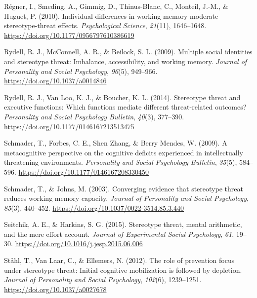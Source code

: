 \documentclass[
  doc, a4paper]{apa7}
\newlength{\cslhangindent}
\newenvironment{CSLReferences}[2] %
 {\begin{list}{}{%
  \setlength{\itemindent}{0pt}
  \setlength{\leftmargin}{0pt}
  \setlength{\parsep}{0pt}
  \ifodd #1
   \setlength{\leftmargin}{\cslhangindent}
   \setlength{\itemindent}{-1\cslhangindent}
  \fi
  \setlength{\itemsep}{#2\baselineskip}}}
 {\end{list}}
\begin{document}
\begin{CSLReferences}{1}{0}
Régner, I., Smeding, A., Gimmig, D., Thinus-Blanc, C., Monteil, J.-M., \& Huguet, P. (2010). Individual differences in working memory moderate stereotype-threat effects. \emph{Psychological Science}, \emph{21}(11), 1646--1648. \url{https://doi.org/10.1177/0956797610386619}

Rydell, R. J., McConnell, A. R., \& Beilock, S. L. (2009). Multiple social identities and stereotype threat: {Imbalance}, accessibility, and working memory. \emph{Journal of Personality and Social Psychology}, \emph{96}(5), 949--966. \url{https://doi.org/10.1037/a0014846}

Rydell, R. J., Van Loo, K. J., \& Boucher, K. L. (2014). Stereotype threat and executive functions: {Which} functions mediate different threat-related outcomes? \emph{Personality and Social Psychology Bulletin}, \emph{40}(3), 377--390. \url{https://doi.org/10.1177/0146167213513475}

Schmader, T., Forbes, C. E., Shen Zhang, \& Berry Mendes, W. (2009). A metacognitive perspective on the cognitive deficits experienced in intellectually threatening environments. \emph{Personality and Social Psychology Bulletin}, \emph{35}(5), 584--596. \url{https://doi.org/10.1177/0146167208330450}

Schmader, T., \& Johns, M. (2003). Converging evidence that stereotype threat reduces working memory capacity. \emph{Journal of Personality and Social Psychology}, \emph{85}(3), 440--452. \url{https://doi.org/10.1037/0022-3514.85.3.440}

Seitchik, A. E., \& Harkins, S. G. (2015). Stereotype threat, mental arithmetic, and the mere effort account. \emph{Journal of Experimental Social Psychology}, \emph{61}, 19--30. \url{https://doi.org/10.1016/j.jesp.2015.06.006}

Ståhl, T., Van Laar, C., \& Ellemers, N. (2012). The role of prevention focus under stereotype threat: {Initial} cognitive mobilization is followed by depletion. \emph{Journal of Personality and Social Psychology}, \emph{102}(6), 1239--1251. \url{https://doi.org/10.1037/a0027678}


\end{CSLReferences}
\end{document}
